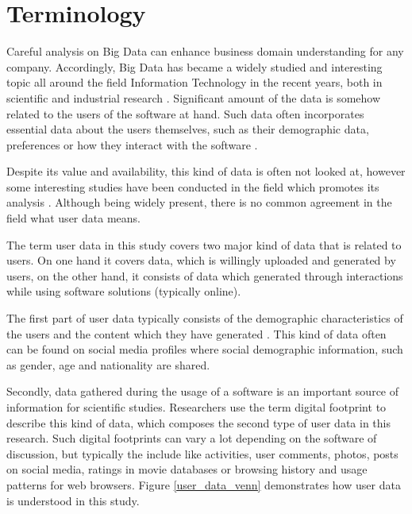 \documentclass[conference]{IEEEtran}
\begin{document}
\section{Terminology}
Careful analysis on Big Data can enhance business domain understanding for any company. Accordingly, Big Data has became a widely studied and interesting topic all around the field Information Technology in the recent years, both in scientific and industrial research \cite{inmon2007tapping, introtodatamining}. Significant amount of the data is somehow related to the users of the software at hand. Such data often incorporates essential data about the users themselves, such as their demographic data, preferences or how they interact with the software 
\cite{jang2015noreciprocity, hu2014we, jang2016teensengagemorewithfewerphotos, han2016teensarefrommars, socialdiversityongithub}. 

Despite its value and availability, this kind of data is often not looked at, however some interesting studies have been conducted in the field which promotes its analysis \cite{jang2016teensengagemorewithfewerphotos}. Although being widely present, there is no common agreement in the field what user data means.

The term user data in this study covers two major kind of data that is related to users. On one hand it covers data, which is willingly uploaded and generated by users, on the other hand, it consists of data which generated through interactions while using software solutions (typically online).

The first part of user data typically consists of the demographic characteristics of the users and the content which they have generated \cite{han2016teensarefrommars}. This kind of data often can be found on social media profiles where social demographic information, such as gender, age and nationality are shared.

Secondly, data gathered during the usage of a software is an important source of information for scientific studies. Researchers use the term digital footprint \cite{youyou2015computer} to describe this kind of data, which composes the second type of user data in this research. Such digital footprints can vary a lot depending on the software of discussion, but typically the include like activities, user comments, photos, posts on social media, ratings in movie databases or browsing history and usage patterns for web browsers. Figure \ref{user_data_venn} demonstrates how user data is understood in this study.
\end{document}

